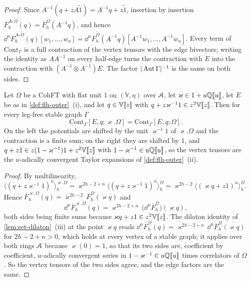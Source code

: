 \begin{proof}
Since $A^{-1}(q+zA\tilde1)=A^{-1}q+z\tilde1$, insertion by insertion $\overline F^{A_*\widetilde\Omega}_h(q)=\overline F^{\widetilde\Omega}_h(A^{-1}q)$, and hence $\dd^n\overline F^{A_*\widetilde\Omega}_h(q)[w_1,\dots,w_n]=\dd^n\overline F^{\widetilde\Omega}_h(A^{-1}q)[A^{-1}w_1,\dots,A^{-1}w_n]$. Every term of $\mathrm{Cont}_\Gamma$ is a full contraction of the vertex tensors with the edge bivectors; writing the identity as $AA^{-1}$ on every half-edge turns the contraction with $E$ into the contraction with $(A^{-1}\otimes A^{-1})E$. The factor $|\operatorname{Aut}\Gamma|^{-1}$ is the same on both sides.
\end{proof}

\begin{lem}
\label{lem:flh-dil}
Let $\Omega$ be a CohFT with flat unit $1$ on $(\mathbb V,\eta)$ over $\mathcal{A}$, let $\varkappa\in 1+u\mathbb{Q}[\![ u ]\!]$, let $E$ be as in \cref{def:flh-outer}~(i), and let $q\in\mathbb V[\![ z ]\!]$ with $q+z\varkappa^{-1}1\in z^2\mathbb V[\![ z ]\!]$. Then for every leg-free stable graph $\Gamma$
\[
\mathrm{Cont}_\Gamma[E,q;\varkappa.\Omega]=\mathrm{Cont}_\Gamma[E,q;\Omega].
\]
On the left the potentials are shifted by the unit $\varkappa^{-1}1$ of $\varkappa.\Omega$ and the contraction is a finite sum; on the right they are shifted by $1$, and $q+z1\in z(1-\varkappa^{-1})1+z^2\mathbb V[\![ z ]\!]$ with $1-\varkappa^{-1}\in u\mathbb{Q}[\![ u ]\!]$, so the vertex tensors are the $u$-adically convergent Taylor expansions of \cref{def:flh-outer}~(ii).
\end{lem}

\begin{proof}
By multilinearity, $\langle(q+z\varkappa^{-1}1)^n\rangle^{\varkappa.\Omega}_h=\varkappa^{2h-2+n}\langle(q+z\varkappa^{-1}1)^n\rangle^{\Omega}_h=\varkappa^{2h-2}\langle(\varkappa q+z1)^n\rangle^{\Omega}_h$. Hence $\overline F^{\varkappa.\Omega}_h(q)=\varkappa^{2h-2}\,\overline F^{\Omega}_h(\varkappa q)$ and
\[
\dd^n\overline F^{\varkappa.\Omega}_h(q)=\varkappa^{2h-2+n}\,\bigl(\dd^n\overline F^{\Omega}_h\bigr)(\varkappa q),
\]
both sides being finite sums because $\varkappa q+z1\in z^2\mathbb V[\![ z ]\!]$. The dilaton identity of \cref{lem:set-dilaton}~(iii) at the point $\varkappa q$ reads $\dd^n\overline F^{\Omega}_h(q)=\varkappa^{2h-2+n}\,\dd^n\overline F^{\Omega}_h(\varkappa q)$ for $2h-2+n>0$, which holds at every vertex of a stable graph; it applies over both rings $\mathcal{A}$ because $\varkappa(0)=1$, so that its two sides are, coefficient by coefficient, $u$-adically convergent series in $1-\varkappa^{-1}\in u\mathbb{Q}[\![ u ]\!]$ times correlators of $\Omega$. So the vertex tensors of the two sides agree, and the edge factors are the same.
\end{proof}


